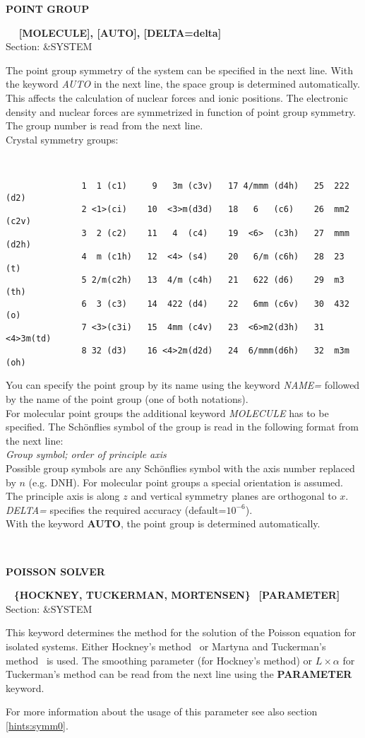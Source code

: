 \documentclass[twoside,10pt,titlepage,a4paper]{article}
\newcommand{\reflabel}[1]{\hypertarget{#1}}
\newcommand{\reflabel}[1]{\label{#1}}
\newcommand{\keyword}[5]{%
\vspace{1.0cm}
\begin{minipage}{15cm}
\reflabel{#1}{\textbf{\large #1}}%
\index{#1}%
\ \textbf{#2}%
\ \textbf{#3}%
\ \textit{#4}%
     \hfill\\\smallskip
     {Section: #5}
     \hfill\\\smallskip\vskip 10pt
\end{minipage}
}%
\newcommand{\desc}[1]{%
   \hspace*{\fill} \parbox{130mm}{\sloppy
                          {#1}%
                             }
     \hfill\\\smallskip
   }%
\newcommand{\desc}[1]{#1\vspace{1ex}}
\begin{document}
\keyword{POINT GROUP}{}{[MOLECULE], [AUTO], [DELTA=delta]}{}{\&SYSTEM}
  \desc{The point group symmetry of
      the system can be specified in the next line.
      With the keyword {\sl AUTO} in the next line,
      the space group is determined automatically.
      This affects the calculation
      of nuclear forces and ionic positions.
      The electronic density and nuclear forces are symmetrized
      in function of point group symmetry.
      The group number is read from the next line.\\
      Crystal symmetry groups:}
\begin{verbatim}
               1  1 (c1)     9   3m (c3v)   17 4/mmm (d4h)   25  222 (d2)
               2 <1>(ci)    10  <3>m(d3d)   18   6   (c6)    26  mm2 (c2v)
               3  2 (c2)    11   4  (c4)    19  <6>  (c3h)   27  mmm (d2h)
               4  m (c1h)   12  <4> (s4)    20   6/m (c6h)   28  23  (t)
               5 2/m(c2h)   13  4/m (c4h)   21   622 (d6)    29  m3  (th)
               6  3 (c3)    14  422 (d4)    22   6mm (c6v)   30  432 (o)
               7 <3>(c3i)   15  4mm (c4v)   23  <6>m2(d3h)   31 <4>3m(td)
               8 32 (d3)    16 <4>2m(d2d)   24  6/mmm(d6h)   32  m3m (oh)
\end{verbatim}
\desc{You can specify the point group by its name using
      the keyword {\sl NAME=} followed by the name of the point group
      (one of both notations).\hfill\\
      For molecular point groups the additional keyword {\sl MO\-LECULE}
      has to be specified. The Sch\"onflies symbol of the group
      is read in the following format from the next line:  \\
      {\em Group symbol; order of principle axis}  \smallskip \\
      Possible group symbols are any Sch\"onflies symbol with the
      axis number replaced by $n$ (e.g. DNH). For molecular
      point groups a special orientation is assumed. The principle
      axis is along $z$ and vertical symmetry planes are orthogonal
      to $x$.\\
      {\sl DELTA=} specifies the required accuracy (default=$10^{-6}$).\\
      With the keyword {\bf AUTO}, the point group is
      determined automatically.}


\keyword{POISSON SOLVER}{ \{HOCKNEY, TUCKERMAN, MORTENSEN\}}{[PARAMETER]}{}{\&SYSTEM}
  \desc{This keyword determines the method for the solution of the
      Poisson equation for isolated systems. Either Hockney's
      method~\cite{Hockney70} or Martyna and Tuckerman's
      method~\cite{Martyna99} is used. The smoothing parameter (for Hockney's
      method) or $L \times \alpha$ for Tuckerman's method can be read from the
      next line using the {\bf PARAMETER} keyword.

      For more information about the usage of this parameter see also
      section \ref{hints:symm0}.}
\end{document}
